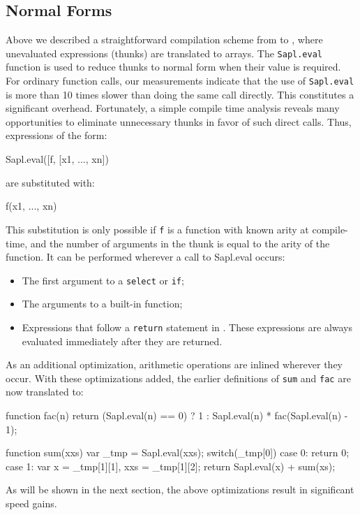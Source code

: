 \subsection{Normal Forms}
Above we described a straightforward compilation scheme from \Sapl to \JS, 
where unevaluated expressions (thunks) are translated to arrays. The
\texttt{Sapl.eval} function is used to reduce thunks to normal form when their
value is required. For ordinary function calls, our measurements indicate that 
the use of \texttt{Sapl.eval} is more than 10 times slower than doing the same
call directly. This constitutes a significant overhead. Fortunately, a simple
compile time analysis reveals many opportunities to eliminate unnecessary 
thunks in favor of such direct calls. Thus, expressions of the form:
\begin{CleanCode}
Sapl.eval([f, [x1, ..., xn])
\end{CleanCode}
are substituted with:
\begin{CleanCode}
f(x1, ..., xn)
\end{CleanCode}
This substitution is only possible if \texttt{f} is a function with known arity
at compile-time, and the number of arguments in the thunk is equal to the arity
of the function. It can be performed wherever a call to \textsf{Sapl.eval} 
occurs:
\begin{itemize}
\item The first argument to a \texttt{select} or \texttt{if};
\item The arguments to a built-in function;
\item Expressions that follow a \texttt{return} statement in \JS. These
      expressions are always evaluated immediately after they are returned.
\end{itemize}

As an additional optimization, arithmetic operations are inlined wherever they
occur. With these optimizations added, the earlier definitions of \texttt{sum} 
and \texttt{fac} are now translated to:
\begin{CleanCode}
function fac(n){
	return (Sapl.eval(n) == 0) ? 1 : Sapl.eval(n) * fac(Sapl.eval(n) - 1);
}

function sum(xxs) {
	var _tmp = Sapl.eval(xxs);
	switch(_tmp[0]){
		case 0: return 0;
		case 1: var x = _tmp[1][1], xxs = _tmp[1][2]; 
		        return Sapl.eval(x) + sum(xs);
	}
}
\end{CleanCode}
As will be shown in the next section, the above optimizations result in
significant speed gains.
